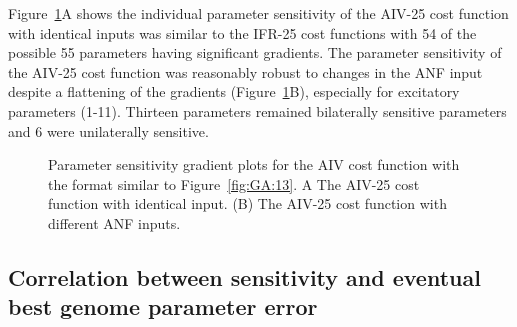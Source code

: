 Figure~\ref{fig:GA:15}A shows the individual parameter sensitivity of the
AIV-25 cost function with identical inputs was similar to the IFR-25 cost
functions with 54 of the possible 55 parameters having significant
gradients.  The parameter sensitivity of the AIV-25 cost function was
reasonably robust to changes in the ANF input despite a flattening of the
gradients (Figure~\ref{fig:GA:15}B), especially for excitatory parameters
(1-11). Thirteen parameters remained bilaterally sensitive parameters and 6
were unilaterally sensitive.  %


\begin{figure}[ht]
  \centering
  \caption{Parameter sensitivity gradient plots for the AIV cost
    function with the format similar to Figure~\ref{fig:GA:13}. A The
    AIV-25 cost function with identical input. (B) The AIV-25 cost
    function with different ANF inputs.%
}
  \label{fig:GA:15}
\end{figure}




\subsection{Correlation between sensitivity and eventual best genome parameter error}\label{sec:GA:corr-betw-sens}






